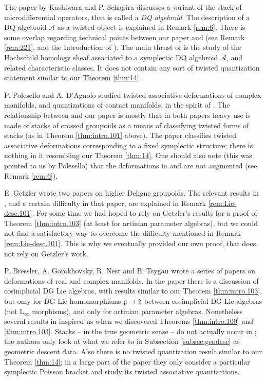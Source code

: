 \documentclass[a4paper, 10pt]{amsart}
\theoremstyle{definition}
\numberwithin{equation}{section}
\newcommand{\mfrak}[1]{\mathfrak{#1}}
\newcommand{\mcal}[1]{\mathcal{#1}}
\newcommand{\mrm}[1]{\mathrm{#1}}
\newcommand{\bsym}[1]{\boldsymbol{#1}}
\newcommand{\g}{\mfrak{g}}
\newcommand{\h}{\mfrak{h}}
\newcommand{\gerbe}[1]{\bsym{\mcal{#1}}}
\begin{document}
The paper \cite{KS2} by Kashiwara and P. Schapira discusses a variant 
of the stack of  microdifferential operators, that is called a {\em DQ
algebroid}. The description of a DQ algebroid $\gerbe{A}$ as a twisted object
is explained in Remark \ref{rem:6}.
There is some overlap regarding technical points between our paper and
\cite{KS2} (see Remark \ref{rem:221}, and the Introduction of \cite{Ye9}). 
The main thrust of \cite{KS2} is the study of the Hochschild homology sheaf 
associated to a symplectic DQ algebroid $\gerbe{A}$, and related 
characteristic classes. It does not contain any sort of twisted quantization
statement similar to our Theorem \ref{thm:14}.

P. Polesello and A. D'Agnolo  \cite{Po, DP1, DP2} studied twisted associative
deformations of complex manifolds, and quantizations of contact manifolds, in
the spirit of  \cite{Ka, KS2}. The relationship between \cite{DP2}
and our paper is mostly that in both papers heavy use is made of stacks of
crossed groupoids as a means of classifying twisted forms of stacks (as in
Theorem \ref{thm:intro.101} above). The paper \cite{Po} classifies twisted
associative deformations corresponding to a fixed  symplectic structure; there
is nothing in it resembling our Theorem \ref{thm:14}. One should also note (this
was pointed to us by Polesello) that the deformations in \cite{Po} and
\cite{KS2} are not augmented (see Remark \ref{rem:6}). 

E. Getzler wrote two papers \cite{Ge1, Ge2} on higher Deligne groupoids. 
The relevant results in \cite{Ge2}, and a certain difficulty in that paper, are
explained in Remark \ref{rem:Lie-desc.101}. 
For some time we had hoped to rely on Getzler's results for a proof of 
Theorem \ref{thm:intro.103} (at least for artinian parameter algebras), but we
could not find a satisfactory way to overcome the difficulty mentioned
in Remark \ref{rem:Lie-desc.101}. This is why we eventually provided our
own proof, that does not rely on Getzler's work.
 
P. Bressler, A. Gorokhovsky, R. Nest and B. Tsygan wrote a series of papers on
deformations of real and complex manifolds. In the paper \cite{BGNT1}
there is a discussion of cosimplicial DG Lie
algebras, with results similar to our Theorem \ref{thm:intro.103},
but only for DG Lie homomorphisms
$\g \to \h$ between cosimplicial DG Lie algebras (not $\mrm{L}_{\infty}$
morphisms), and only for artinian parameter algebras. 
Nonetheless several results in \cite{BGNT1} inspired us when we discovered
Theorems \ref{thm:intro.100} and \ref{thm:intro.103}.
Stacks -- in the true geometric sense -- do
not actually occur in \cite{BGNT1}; the authors only look at what we refer to
in Subsection \ref{subsec:geodesc} 
as geometric descent data. Also there is no twisted quantization result
similar to our Theorem \ref{thm:14}; in a large part of the paper
they only consider a particular symplectic Poisson bracket and study its
twisted associative quantizations. 
\end{document}
